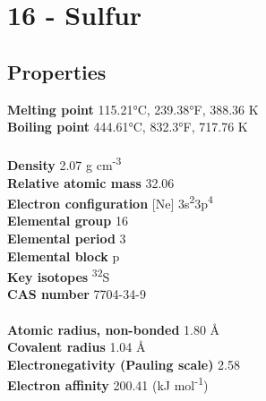 \section{16 - Sulfur}
\label{sec:elem-sulfur}
\subsection{Properties}
\textbf{Melting point} 115.21°C, 239.38°F, 388.36 K\\
\textbf{Boiling point} 444.61°C, 832.3°F, 717.76 K\\
\\
\textbf{Density} 2.07 g cm\textsuperscript{-3}\\
\textbf{Relative atomic mass} 32.06\\
\textbf{Electron configuration} [Ne] 3s\textsuperscript{2}3p\textsuperscript{4}\\
\textbf{Elemental group} 16\\
\textbf{Elemental period} 3\\
\textbf{Elemental block} p\\
\textbf{Key isotopes} \textsuperscript{32}S\\
\textbf{CAS number} 7704-34-9\\
\\
\textbf{Atomic radius, non-bonded} 1.80 Å\\
\textbf{Covalent radius} 1.04 Å\\
\textbf{Electronegativity (Pauling scale)} 2.58\\
\textbf{Electron affinity} 200.41 (kJ mol\textsuperscript{-1})\\